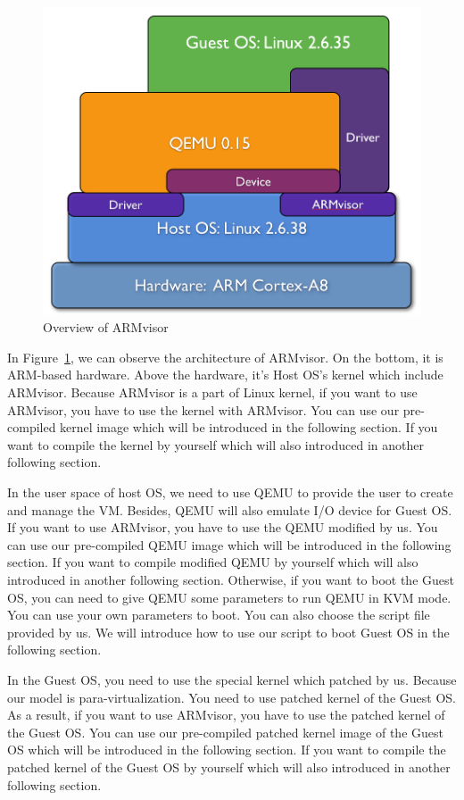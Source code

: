 \documentclass[12pt]{article}  %
\begin{document}
\begin{figure}[h]  %
\includegraphics[scale=0.4]{armvisor_archi.png}
\caption{Overview of ARMvisor} 
\label{armvisor_archi}
\end{figure}
In Figure~\ref{armvisor_archi}, we can observe the architecture of ARMvisor. On the bottom, it is ARM-based hardware. Above the hardware, it's Host OS's kernel which include ARMvisor. Because ARMvisor is a part of Linux kernel, if you want to use ARMvisor, you have to use the kernel with ARMvisor. You can use our pre-compiled kernel image which will be introduced in the following section. If you want to compile the kernel by yourself which will also introduced in another following section.

In the user space of host OS, we need to use QEMU to provide the user to create and manage the VM. Besides, QEMU will also emulate I/O device for Guest OS. If you want to use ARMvisor, you have to use the QEMU modified by us. You can use our pre-compiled QEMU image which will be introduced in the following section. If you want to compile modified QEMU by yourself which will also introduced in another following section. Otherwise, if you want to boot the Guest OS, you can need to give QEMU some parameters to run QEMU in KVM mode. You can use your own parameters to boot. You can also choose the script file provided by us. We will introduce how to use our script to boot Guest OS in the following section.

In the Guest OS, you need to use the special kernel which patched by us. Because our model is para-virtualization. You need to use patched kernel of the Guest OS. As a result, if you want to use ARMvisor, you have to use the patched kernel of the Guest OS. You can use our pre-compiled patched kernel image of the Guest OS which will be introduced in the following section. If you want to compile the patched kernel of the Guest OS by yourself which will also introduced in another following section.
\end{document}
